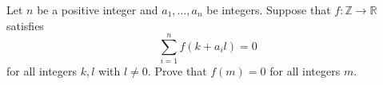 Let $n$ be a positive integer and $a_1,\ldots,a_n$ be integers. Suppose that $f:\mathbb{Z}\to\mathbb{R}$ satisfies \[\displaystyle\sum_{i=1}^nf\left(k+a_il\right)=0\] for all integers $k,l$ with $l\neq0$. Prove that $f\left(m\right)=0$ for all integers $m$.